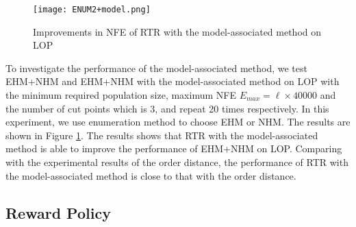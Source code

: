 \begin{figure}[htbp] 
        \centering
        \texttt{[image: ENUM2+model.png]}
        \caption{ Improvements in NFE of RTR with the model-associated method on LOP } 
        \label{fig:enum2_model}
\end{figure}

To investigate the performance of the model-associated method, we test EHM+NHM and EHM+NHM with the model-associated method on LOP with the minimum required population size, maximum NFE $E_{max} = \ell\times 40000$ and the number of cut points which is 3, and repeat 20 times respectively. In this experiment, we use enumeration method to choose EHM or NHM. The results are shown in Figure \ref{fig:enum2_model}. The results shows that RTR with the model-associated method is able to improve the performance of EHM+NHM on LOP. Comparing with the experimental results of the order distance, the performance of RTR with the model-associated method is close to that with the order distance. 

\subsection*{Reward Policy}

